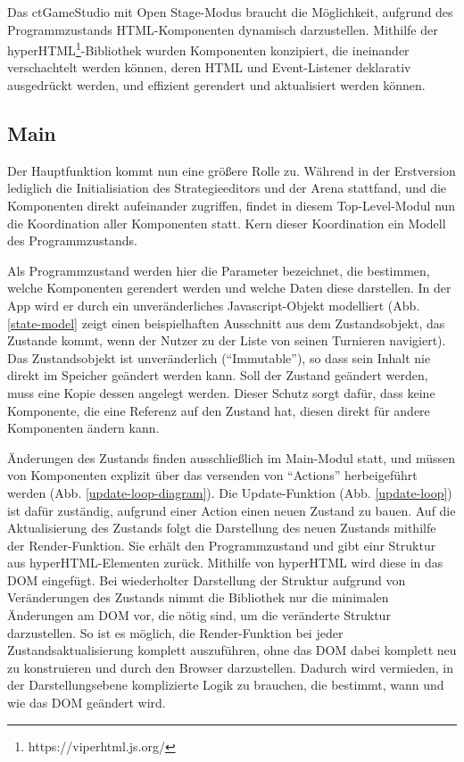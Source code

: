 Das ctGameStudio mit Open Stage-Modus braucht die Möglichkeit, aufgrund des Programmzustands
HTML-Komponenten dynamisch darzustellen. Mithilfe der
hyperHTML\footnote{https://viperhtml.js.org/}-Bibliothek wurden Komponenten konzipiert, die ineinander
verschachtelt werden können, deren HTML und Event-Listener deklarativ ausgedrückt werden, und
effizient gerendert und aktualisiert werden können.

\subsection{Main}

Der Hauptfunktion kommt nun eine größere Rolle zu. Während in der Erstversion lediglich die
Initialisiation des Strategieeditors und der Arena stattfand, und die Komponenten direkt aufeinander
zugriffen, findet in diesem Top-Level-Modul nun die Koordination aller Komponenten statt. Kern
dieser Koordination ein Modell des Programmzustands.

Als Programmzustand werden hier die Parameter bezeichnet, die bestimmen, welche Komponenten
gerendert werden und welche Daten diese darstellen. In der App wird er durch ein unveränderliches
Javascript-Objekt modelliert (Abb. \ref{state-model} zeigt einen beispielhaften Ausschnitt aus dem
Zustandsobjekt, das Zustande kommt, wenn der Nutzer zu der Liste von seinen Turnieren navigiert). Das
Zustandsobjekt ist unveränderlich (\enquote{Immutable}), so dass sein Inhalt nie direkt im Speicher
geändert werden kann. Soll der Zustand geändert werden, muss eine Kopie dessen angelegt werden.
Dieser Schutz sorgt dafür, dass keine Komponente, die eine Referenz auf den Zustand hat, diesen
direkt für andere Komponenten ändern kann.

Änderungen des Zustands finden ausschließlich im Main-Modul statt, und müssen von Komponenten
explizit über das versenden von \enquote{Actions} herbeigeführt werden (Abb.
\ref{update-loop-diagram}). Die Update-Funktion (Abb. \ref{update-loop}) ist dafür zuständig,
aufgrund einer Action einen neuen Zustand zu bauen. Auf die Aktualisierung des Zustands folgt die
Darstellung des neuen Zustands mithilfe der Render-Funktion. Sie erhält den Programmzustand und gibt
einr Struktur aus hyperHTML-Elementen zurück. Mithilfe von hyperHTML wird diese in das DOM
eingefügt. Bei wiederholter Darstellung der Struktur aufgrund von Veränderungen des Zustands nimmt
die Bibliothek nur die minimalen Änderungen am DOM vor, die nötig sind, um die veränderte Struktur
darzustellen. So ist es möglich, die Render-Funktion bei jeder Zustandsaktualisierung komplett
auszuführen, ohne das DOM dabei komplett neu zu konstruieren und durch den Browser darzustellen.
Dadurch wird vermieden, in der Darstellungsebene komplizierte Logik zu brauchen, die bestimmt, wann
und wie das DOM geändert wird.

